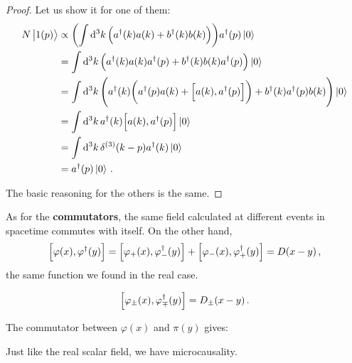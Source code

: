 \documentclass[main.tex]{subfiles}
\begin{document}
\begin{proof}
Let us show it for one of them: 
%
\begin{align}
N \ket{1 (p)} &\propto
\qty(\int \dd[3]{k} \qty(a ^\dag(k) a(k) + b ^\dag(k) b (k))) 
a ^\dag (p) \ket{0}  \\
&= \int \dd[3]{k} \qty( a ^\dag (k) a (k) a ^\dag(p) + b ^\dag(k) b(k) a ^\dag (p)) \ket{0}  \\
&= \int \dd[3]{k} \qty( a ^\dag (k) \qty( a ^\dag(p) a (k) + \qty[a(k), a ^\dag(p)]) + b ^\dag(k) a ^\dag (p) b(k)) \ket{0}  \\
&= \int \dd[3]{k} a ^\dag (k) \qty[a(k), a ^\dag(p) ]  \ket{0}   \\
&= \int \dd[3]{k} \delta^{(3)} (k-p) a ^\dag(k) \ket{0} \\
&= a ^\dag(p) \ket{0}
\,.
\end{align}

The basic reasoning for the others is the same. 
\end{proof}

As for the \textbf{commutators}, the same field calculated at different events in spacetime commutes with itself. On the other hand, 
%
\begin{align}
\qty[ \varphi (x), \varphi ^\dag(y)]
= \qty[\varphi_{+} (x), \varphi ^\dag_{-} (y)]
+ \qty[\varphi_{-} (x), \varphi ^\dag_{+} (y)]
= D(x-y)
\,,
\end{align}
%
the same function we found in the real case. 

\begin{claim}
\begin{align}
\qty[\varphi_{\pm} (x), \varphi ^\dag_{\mp}(y)] = D_{\pm} (x-y)
\,.
\end{align}
\end{claim}

\begin{claim}
The commutator between \(\varphi (x)\) and \(\pi (y)\) gives: 
\end{claim}

Just like the real scalar field, we have microcausality. 
\end{document}
